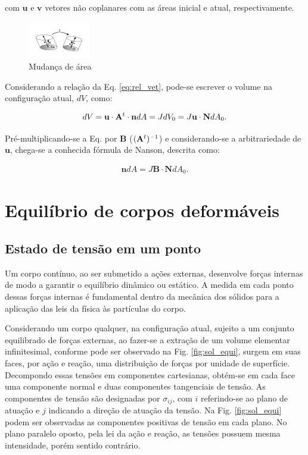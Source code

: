 \documentclass[tese_patricia]{subfiles}
\begin{document}
\noindent com $\mathbf{u}$ e $\mathbf{v}$ vetores não coplanares com as áreas inicial e atual, respectivamente.

\begin{figure}[htb!]
	\centering
	\includegraphics[scale=6.0,trim=0cm 0.2cm 0cm 0cm, clip=true]{Imagens/Cap4/sol_def_area.pdf}	
	\caption{Mudança de área}
	\label{fig:solido_def_area}
\end{figure}

Considerando a relação da Eq. \eqref{eq:rel_vet}, pode-se escrever o volume na configuração atual, $dV$, como:

\begin{align}
	dV = \mathbf{u} \cdot \mathbf{A}^{t} \cdot \mathbf{n} dA = J dV_0 = J \mathbf{u} \cdot \mathbf{N} dA_0. \label{eq:dv}
\end{align}

Pré-multiplicando-se a Eq.  por $\mathbf{B}$ ($(\mathbf{A}^{t})^{-1}$) e considerando-se a arbitrariedade de $\mathbf{u}$, chega-se a conhecida fórmula de Nanson, descrita como:

\begin{align}
\mathbf{n}dA = J \mathbf{B} \cdot \mathbf{N} dA_{0}. \label{eq:Nanson}
\end{align}


\section{Equilíbrio de corpos deformáveis} \label{capitulo:Cap3:EquilibrioCorposDeformaveis}

\subsection{Estado de tensão em um ponto}

Um corpo contínuo, ao ser submetido a ações externas, desenvolve forças internas de modo a garantir o equilíbrio dinâmico ou estático. A medida em cada ponto dessas forças internas é fundamental dentro da mecânica dos sólidos para a aplicação das leis da física às partículas do corpo.

Considerando um corpo qualquer, na configuração atual, sujeito a um conjunto equilibrado de forças externas, ao fazer-se a extração de um volume elementar infinitesimal, conforme pode ser observado na Fig. \ref{fig:sol_equi}, surgem em suas faces, por ação e reação, uma distribuição de forças por unidade de superfície. Decompondo essas tensões em componentes cartesianas, obtém-se em cada face uma componente normal e duas componentes tangenciais de tensão. As componentes de tensão são designadas por $\sigma_{ij}$, com $i$ referindo-se ao plano de atuação e $j$ indicando a direção de atuação da tensão. Na Fig. \ref{fig:sol_equi} podem ser observadas as componentes positivas de tensão em cada plano. No plano paralelo oposto, pela lei da ação e reação, as tensões possuem mesma intensidade, porém sentido contrário.
\end{document}
